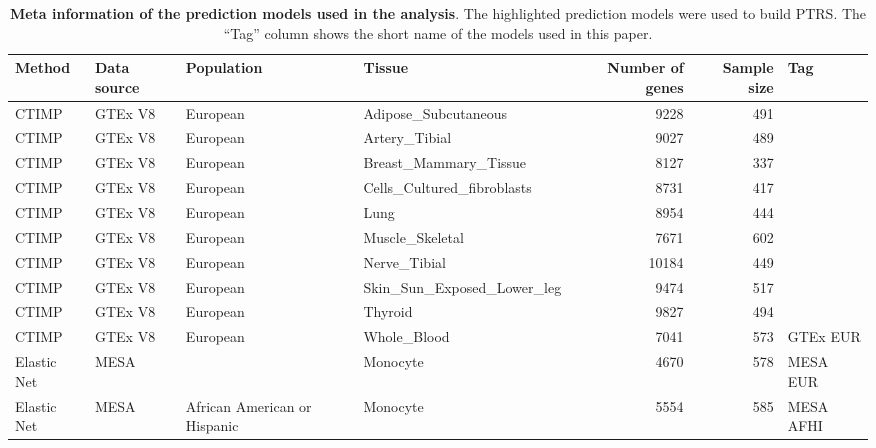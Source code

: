 \begin{table}[ht]
\centering
\begingroup\tiny
\begin{tabular}{llllrrl}
  \toprule
{\textbf{Method}} & {\textbf{Data source}} & {\textbf{Population}} & {\textbf{Tissue}} & {\textbf{Number of genes}} & {\textbf{Sample size}} & {\textbf{Tag}} \\ 
  \midrule
CTIMP & GTEx V8 & European & Adipose\_Subcutaneous &   9228 &    491 &  \\ 
  CTIMP & GTEx V8 & European & Artery\_Tibial &   9027 &    489 &  \\ 
  CTIMP & GTEx V8 & European & Breast\_Mammary\_Tissue &   8127 &    337 &  \\ 
  CTIMP & GTEx V8 & European & Cells\_Cultured\_fibroblasts &   8731 &    417 &  \\ 
  CTIMP & GTEx V8 & European & Lung &   8954 &    444 &  \\ 
  CTIMP & GTEx V8 & European & Muscle\_Skeletal &   7671 &    602 &  \\ 
  CTIMP & GTEx V8 & European & Nerve\_Tibial &  10184 &    449 &  \\ 
  CTIMP & GTEx V8 & European & Skin\_Sun\_Exposed\_Lower\_leg &   9474 &    517 &  \\ 
  CTIMP & GTEx V8 & European & Thyroid &   9827 &    494 &  \\ 
   \rowcolor{yellow}CTIMP & GTEx V8 & European & Whole\_Blood &   7041 &    573 & GTEx EUR \\ 
   \rowcolor{yellow}Elastic Net & MESA &  & Monocyte &   4670 &    578 & MESA EUR \\ 
   \rowcolor{yellow}Elastic Net & MESA & African American or Hispanic & Monocyte &   5554 &    585 & MESA AFHI \\ 
   \bottomrule
\end{tabular}
\endgroup
\caption{\textbf{Meta information of the prediction models used in the analysis}. The highlighted prediction models were used to build PTRS. The ``Tag'' column shows the short name of the models used in this paper.} 
\label{tab:prediction_model}
\end{table}
